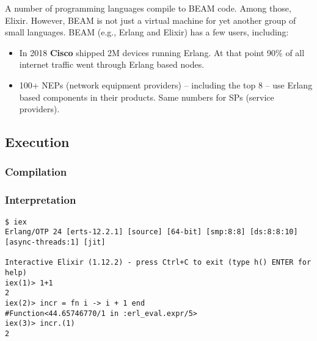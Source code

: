{%
A number of programming languages compile to BEAM code. Among those, Elixir. However, BEAM is not just a virtual machine for yet another group of small languages. BEAM (e.g., Erlang and Elixir) has a few users, including: 
\begin{itemize}
   is using Elixir to scale to 5M concurrent users.
   uses Erlang to power its chat service serving 100M active users.
   uses Erlang to run messaging servers, each covering 2M users.
   uses Erlang for its GPRS, 3G, 4G and 5G infrastructure, and has a market share of 40\%.
  \item In 2018 \textbf{Cisco} shipped 2M devices running Erlang. At that point 90\% of all internet traffic went through Erlang based nodes.
  \item 100+ NEPs (network equipment providers) -- including the top 8 -- use Erlang based components in their products. Same numbers for SPs (service providers).
\end{itemize}

\subsection{Execution}
\subsubsection{Compilation}
\subsubsection{Interpretation}

\begin{verbatim}
$ iex
Erlang/OTP 24 [erts-12.2.1] [source] [64-bit] [smp:8:8] [ds:8:8:10] [async-threads:1] [jit]

Interactive Elixir (1.12.2) - press Ctrl+C to exit (type h() ENTER for help)
iex(1)> 1+1
2
iex(2)> incr = fn i -> i + 1 end
#Function<44.65746770/1 in :erl_eval.expr/5>
iex(3)> incr.(1)
2
\end{verbatim}

}
